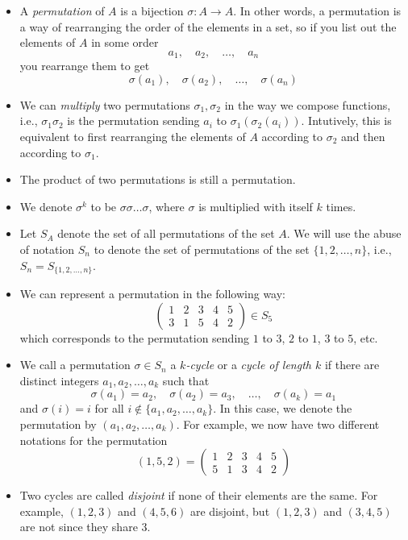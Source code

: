 \documentclass[10pt]{article}
\begin{document}
\begin{itemize}
\item A \emph{permutation} of $A$ is a bijection $\sigma:A\to A$. In other words, a permutation is a way of rearranging the order of the elements in a set, so if you list out the elements of $A$ in some order
\[a_1,\quad a_2,\quad\dots,\quad a_n\]
you rearrange them to get
\[\sigma(a_1),\quad\sigma(a_2),\quad\dots,\quad\sigma(a_n)\]

\item We can \emph{multiply} two permutations $\sigma_1,\sigma_2$ in the way we compose functions, i.e., $\sigma_1\sigma_2$ is the permutation sending $a_i$ to $\sigma_1(\sigma_2(a_i))$. Intutively, this is equivalent to first rearranging the elements of $A$ according to $\sigma_2$ and then according to $\sigma_1$.

\item The product of two permutations is still a permutation.

\item We denote $\sigma^k$ to be $\sigma\sigma\dots\sigma$, where $\sigma$ is multiplied with itself $k$ times.

\item Let $S_A$ denote the set of all permutations of the set $A$. We will use the abuse of notation $S_n$ to denote the set of permutations of the set $\{1,2,\dots,n\}$, i.e., $S_n=S_{\{1,2,\dots,n\}}$.

\item We can represent a permutation in the following way:
\[\begin{pmatrix}1&2&3&4&5\\3&1&5&4&2\end{pmatrix}\in S_5\]
which corresponds to the permutation sending $1$ to $3$, $2$ to $1$, $3$ to $5$, etc.

\item We call a permutation $\sigma\in S_n$ a \emph{$k$-cycle} or a \emph{cycle of length $k$} if there are distinct integers $a_1,a_2,\dots,a_k$ such that
\[\sigma(a_1)=a_2,\quad\sigma(a_2)=a_3,\quad\dots,\quad\sigma(a_k)=a_1\] and $\sigma(i)=i$ for all $i\not\in\{a_1,a_2,\dots,a_k\}$. In this case, we denote the permutation by $(a_1,a_2,\dots,a_k)$. For example, we now have two different notations for the permutation
\[(1,5,2)=\begin{pmatrix}1&2&3&4&5\\5&1&3&4&2\end{pmatrix}\]

\item Two cycles are called \emph{disjoint} if none of their elements are the same. For example, $(1,2,3)$ and $(4,5,6)$ are disjoint, but $(1,2,3)$ and $(3,4,5)$ are not since they share $3$.


\end{itemize}
\end{document}
